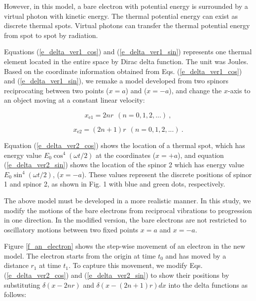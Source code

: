 \documentclass[reprint,amsmath,amssymb,aps,draft]{revtex4-1}
\numberwithin{equation}{section}%
\begin{document}
    However, in this model, a bare electron with potential energy is surrounded by a virtual photon with kinetic energy. The thermal potential energy can exist as discrete thermal spots. Virtual photons can transfer the thermal potential energy from spot to spot by radiation.

    Equations (\ref{e_delta_ver1_cos}) and (\ref{e_delta_ver1_sin}) represents one thermal element located in the entire space by Dirac delta function. The unit was Joules. Based on the coordinate information obtained from Eqs. (\ref{e_delta_ver1_cos}) and (\ref{e_delta_ver1_sin}), we remake a model developed from two spinors reciprocating between two points ($x = a$) and ($x = -a$), and change the $x$-axis to an object moving at a constant linear velocity:
        
        \begin{equation}
                x_{\mathrm{e1}} = 2 n r
                \ \ (n = 0, 1, 2,...)
                \ ,
            \label{e_delta_ver2_cos}
        \end{equation}

        \begin{equation}
                x_{\mathrm{e2}} = (2 n + 1) r
                \ \ (n = 0, 1, 2,...)
                \ .
            \label{e_delta_ver2_sin}
        \end{equation}


    Equation (\ref{e_delta_ver2_cos}) shows the location of a thermal spot, which has energy value $E_{0} \cos^{4} \left( \omega t / 2 \right)$ at the coordinates ($x = +a$), and equation (\ref{e_delta_ver2_sin}) shows the location of the spinor 2 which has energy value $E_{0} \sin^{4} \left( \omega t / 2 \right)$, ($x = -a$). These values represent the discrete positions of spinor 1 and spinor 2, as shown in Fig. 1 with blue and green dots, respectively.

    The above model must be developed in a more realistic manner. In this study, we modify the motions of the bare electrons from reciprocal vibrations to progression in one direction. In the modified version, the bare electrons are not restricted to oscillatory motions between two fixed points $x = a$ and $x = -a$. 

    Figure \ref{f_an_electron} shows the step-wise movement of an electron in the new model. The electron starts from the origin at time $t_{0}$ and has moved by a distance $r_{1}$ at time $t_{1}$. To capture this movement, we modify Eqs. (\ref{e_delta_ver2_cos}) and (\ref{e_delta_ver2_sin}) to show their positions by substituting $\delta(x - 2 n r)$ and $\delta(x - (2 n + 1) r ) dx$ into the delta functions as follows:
\end{document}
